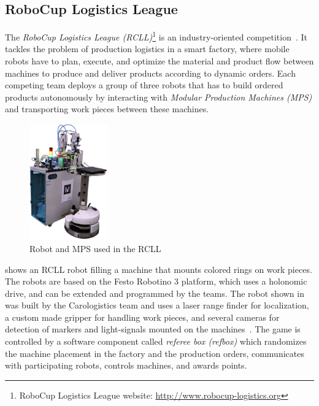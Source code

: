 \subsection{RoboCup Logistics League}

The \emph{RoboCup Logistics League (RCLL)}\footnote{RoboCup Logistics
  League website: \url{http://www.robocup-logistics.org}} is an
industry-oriented competition~\cite{LLSF-Rules-2016}. It tackles the
problem of production logistics in a smart factory, where mobile
robots have to plan, execute, and optimize the material and product
flow between machines to produce and deliver products according to
dynamic orders. Each competing team deploys a group of three robots
that has to build ordered products autonomously by interacting with
\emph{Modular Production Machines (MPS)} and transporting work pieces
between these machines.
\begin{figure}
  \centering
  \vspace{-2.7ex}
  \includegraphics[width=0.3\textwidth]{img/rcll}
  \vspace{-4ex}
  \caption[Robot and MPS used in the RCLL]{Robot and MPS used in the RCLL~\cite{chapter-cps}}
  \label{fig:rcll}
\end{figure}
 shows an RCLL robot filling a machine that mounts
colored rings on work pieces. The robots are based on the Festo
Robotino 3 platform, which uses a holonomic drive, and can be extended
and programmed by the teams. The robot shown in  was
built by the Carologistics team and uses a laser range finder for
localization, a custom made gripper for handling work pieces, and
several cameras for detection of markers and light-signals mounted on
the machines~\cite{Carologistics2015,chapter-cps}. The game is
controlled by a software component called \emph{referee box (refbox)}
which randomizes the machine placement in the factory and the
production orders, communicates with participating robots, controls
machines, and awards points.

